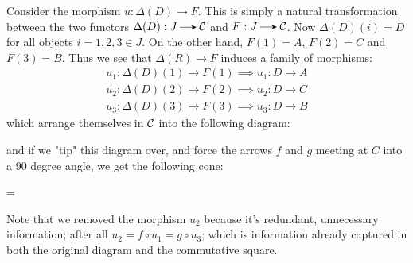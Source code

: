     Consider the morphism $u: \Delta(D) \to F$. This is simply a
    natural transformation between the two functors $\Delta(D): J \to
    \cc$ and $F: J \to \cc$. Now $\Delta(D)(i) = D$ for all objects $i
    = 1, 2, 3 \in J$. On the other hand,
    $F(1) = A$, $F(2) = C$ and $F(3) = B$. 
    Thus we see that $\Delta(R) \to F$ induces a family of morphisms:
    \begin{align*}
    u_1: \Delta(D)(1) \to F(1) \implies u_1: D \to A\\
    u_2: \Delta(D)(2) \to F(2) \implies u_2: D \to C\\
    u_3: \Delta(D)(3) \to F(3) \implies u_3: D \to B
    \end{align*}
    which arrange themselves in $\mathcal{C}$ into the following diagram:
    \begin{center}
    \end{center}
    and if we "tip" this diagram over, and force the arrows $f$ and
    $g$ meeting at
    $C$ into a 90 degree angle, we get the following cone:
    \begin{center}
    = 
    \end{center}    
    Note that we removed the morphism $u_2$ because it's redundant,
    unnecessary information; after all $u_2 = f \circ u_1 = g \circ
    u_3$; which is information already captured in both the original
    diagram and the commutative square. 

